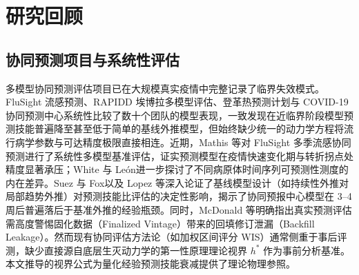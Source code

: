 \documentclass[11pt,a4paper]{article}
\theoremstyle{plain}
\theoremstyle{definition}
\begin{document}
\section{研究回顾}

\subsection{协同预测项目与系统性评估}
多模型协同预测评估项目已在大规模真实疫情中完整记录了临界失效模式。FluSight 流感预测\citep{mcgowan2019collaborative}、RAPIDD 埃博拉多模型评估\citep{viboud2018rapidd}、登革热预测计划\citep{johansson2019open}与 COVID-19 协同预测中心\citep{cramer2022evaluation}系统性比较了数十个团队的模型表现，一致发现在近临界阶段模型预测技能普遍降至甚至低于简单的基线外推模型，但始终缺少统一的动力学方程将流行病学参数与可达精度极限直接相连。近期，Mathis 等\citep{flusight2024evaluation}对 FluSight 多季流感协同预测进行了系统性多模型基准评估，证实预测模型在疫情快速变化期与转折拐点处精度显著承压；White 与 Le{\'o}n\citep{white2026forecastability}进一步探讨了不同病原体时间序列可预测性测度的内在差异。Suez 与 Fox\citep{suez2026baseline}以及 Lopez 等\citep{lopez2024challenges}深入论证了基线模型设计（如持续性外推对局部趋势外推）对预测技能比评估的决定性影响，揭示了协同预报中心模型在 3--4 周后普遍落后于基准外推的经验瓶颈。同时，McDonald 等\citep{mcdonald2021auxiliary}明确指出真实预测评估需高度警惕固化数据（Finalized Vintage）带来的回填修订泄漏（Backfill Leakage）。然而现有协同评估方法论（如加权区间评分 WIS\citep{bracher2021evaluating}）通常侧重于事后评测，缺少直接源自底层生灭动力学的第一性原理理论视界 $h^*$ 作为事前分析基准。本文推导的视界公式为量化经验预测技能衰减提供了理论物理参照。
\end{document}
